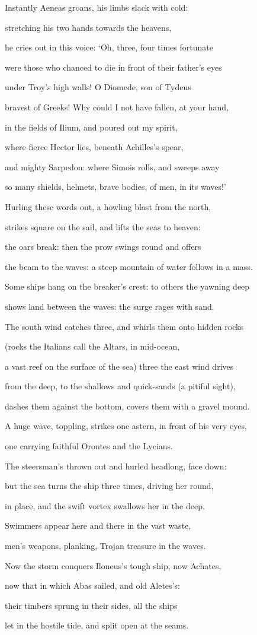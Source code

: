 \documentclass[10pt, a4paper, titlepage]{article}
\begin{document}
Instantly Aeneas groans, his limbs slack with cold:

stretching his two hands towards the heavens,

he cries out in this voice: ‘Oh, three, four times fortunate

were those who chanced to die in front of their father’s eyes

under Troy’s high walls! O Diomede, son of Tydeus

bravest of Greeks! Why could I not have fallen, at your hand,

in the fields of Ilium, and poured out my spirit,

where fierce Hector lies, beneath Achilles’s spear,

and mighty Sarpedon: where Simois rolls, and sweeps away

so many shields, helmets, brave bodies, of men, in its waves!’

Hurling these words out, a howling blast from the north,

strikes square on the sail, and lifts the seas to heaven:

the oars break: then the prow swings round and offers

the beam to the waves: a steep mountain of water follows in a mass.

Some ships hang on the breaker’s crest: to others the yawning deep

shows land between the waves: the surge rages with sand.

The south wind catches three, and whirls them onto hidden rocks

(rocks the Italians call the Altars, in mid-ocean,

a vast reef on the surface of the sea) three the east wind drives

from the deep, to the shallows and quick-sands (a pitiful sight),

dashes them against the bottom, covers them with a gravel mound.

A huge wave, toppling, strikes one astern, in front of his very eyes,

one carrying faithful Orontes and the Lycians.

The steersman’s thrown out and hurled headlong, face down:

but the sea turns the ship three times, driving her round,

in place, and the swift vortex swallows her in the deep.

Swimmers appear here and there in the vast waste,

men’s weapons, planking, Trojan treasure in the waves.

Now the storm conquers Iloneus’s tough ship, now Achates,

now that in which Abas sailed, and old Aletes’s:

their timbers sprung in their sides, all the ships

let in the hostile tide, and split open at the seams.
\end{document}
